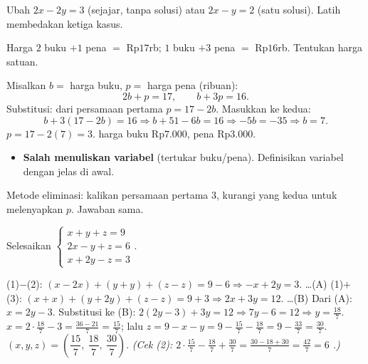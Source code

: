 \begin{variasi}
Ubah $2x-2y=3$ (sejajar, tanpa solusi) atau $2x-y=2$ (satu solusi). Latih
membedakan ketiga kasus.
\end{variasi}

\begin{soalbox}{}
Harga $2$ buku $+1$ pena $=$ Rp$17$rb; $1$ buku $+3$ pena $=$ Rp$16$rb.
Tentukan harga satuan.
\end{soalbox}

\jawab
{} Misalkan $b=$ harga buku, $p=$ harga pena (ribuan):
\[
2b+p=17,\qquad b+3p=16.
\]
 Substitusi: dari persamaan pertama $p=17-2b$. Masukkan ke kedua:
\[
b+3(17-2b)=16\Rightarrow b+51-6b=16\Rightarrow -5b=-35\Rightarrow b=7.
\]
 $p=17-2(7)=3$.
\jadi harga buku Rp$7.000$, pena Rp$3.000$.

\begin{jebakan}
\begin{itemize}[leftmargin=*,topsep=2pt]
  \item \textbf{Salah menuliskan variabel} (tertukar buku/pena). Definisikan
  variabel dengan jelas di awal.
\end{itemize}
\end{jebakan}

\begin{variasi}
Metode eliminasi: kalikan persamaan pertama $3$, kurangi yang kedua untuk
melenyapkan $p$. Jawaban sama.
\end{variasi}

\begin{soalbox}{}
Selesaikan $\begin{cases} x+y+z=9\\ 2x-y+z=6\\ x+2y-z=3\end{cases}$.
\end{soalbox}

\jawab
{} (1)$-$(2): $(x-2x)+(y+y)+(z-z)=9-6\Rightarrow -x+2y=3$. \dots(A)
 (1)$+$(3): $(x+x)+(y+2y)+(z-z)=9+3\Rightarrow 2x+3y=12$. \dots(B)
 Dari (A): $x=2y-3$. Substitusi ke (B): $2(2y-3)+3y=12\Rightarrow
7y-6=12\Rightarrow y=\frac{18}{7}$.
 $x=2\cdot\frac{18}{7}-3=\frac{36-21}{7}=\frac{15}{7}$; lalu
$z=9-x-y=9-\frac{15}{7}-\frac{18}{7}=9-\frac{33}{7}=\frac{30}{7}$.
\jadi $(x,y,z)=\left(\dfrac{15}{7},\ \dfrac{18}{7},\ \dfrac{30}{7}\right)$.
\emph{(Cek (2): $2\cdot\frac{15}{7}-\frac{18}{7}+\frac{30}{7}
=\frac{30-18+30}{7}=\frac{42}{7}=6$ \checkmark.)}

